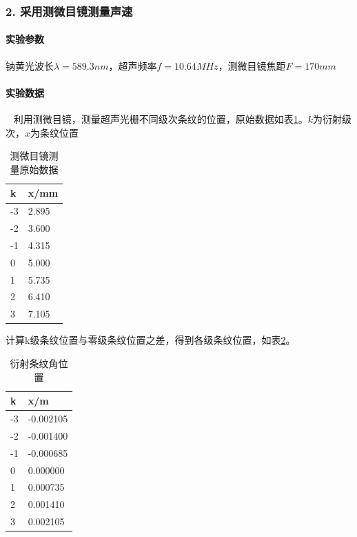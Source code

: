 \documentclass[12pt,a4paper,UTF8]{ctexart}
\begin{document}
		
	\subsubsection*{2. 采用测微目镜测量声速}
		\paragraph{实验参数} 钠黄光波长$\lambda = 589.3 nm$，超声频率$f = 10.64 MHz$，测微目镜焦距$F = 170mm$
		\paragraph{实验数据}~
		\newline
		\indent
		利用测微目镜，测量超声光栅不同级次条纹的位置，原始数据如表\ref{tab:3}。$k$为衍射级次，$x$为条纹位置
		\begin{table}[htbp]
			\centering
			\begin{tabular}{|l|l|}
			\hline
				k & x/mm \\ \hline
				-3 & 2.895 \\ \hline
				-2 & 3.600 \\ \hline
				-1 & 4.315 \\ \hline
				0 & 5.000 \\ \hline
				1 & 5.735 \\ \hline
				2 & 6.410 \\ \hline
				3 & 7.105 \\ \hline
			\end{tabular}
			\caption{测微目镜测量原始数据}
			\label{tab:3}
		\end{table}

		计算k级条纹位置与零级条纹位置之差，得到各级条纹位置，如表\ref{tab:4}。
		\begin{table}[htbp]
			\centering
			\begin{tabular}{|l|l|}
			\hline
				k & x/m \\ \hline
				-3 & -0.002105 \\ \hline
				-2 & -0.001400 \\ \hline
				-1 & -0.000685 \\ \hline
				0 & 0.000000 \\ \hline
				1 & 0.000735 \\ \hline
				2 & 0.001410 \\ \hline
				3 & 0.002105 \\ \hline
			\end{tabular}
			\caption{衍射条纹角位置}
			\label{tab:4}
		\end{table}
		
\end{document}
